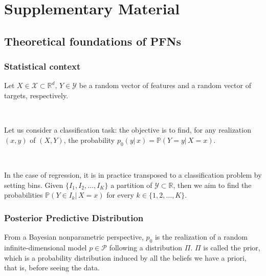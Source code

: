 \documentclass{article}
\begin{document}








\clearpage
\section{Supplementary Material}

\subsection{Theoretical foundations of PFNs} \label{theory_pfn}


\subsubsection{Statistical context}

Let $X \in \mathcal{X} \subset \mathbb{R}^d, \, Y \in \mathcal{Y}$ be a random vector of features and a random vector of targets, respectively.

~ 

Let us consider a classification task: the objective is to find, for any realization $(x,y)$ of $(X,Y)$, the probability $p_0(y|\, x) = \mathbb{P}(Y=y | \, X=x)$.

~ 

In the case of regression, it is in practice transposed to a classification problem by setting bins. Given $\{I_1, I_2, \dots, I_K \}$ a partition of $\mathcal{Y} \subset \mathbb{R}$, then we aim to find the probabilities $\mathbb{P}(Y \in I_k | \, X=x)$ for every $k \in \{1,2,\dots,K\}$.

\subsubsection{Posterior Predictive Distribution}

From a Bayesian nonparametric perspective, $p_0$ is the realization of a random infinite-dimensional model $p \in \mathcal{P}$ following a distribution $\Pi$. $\Pi$ is called the prior, which is a probability distribution induced by all the beliefs we have a priori, that is, before seeing the data.
\end{document}
